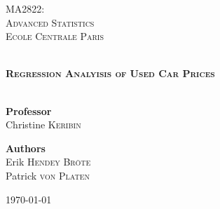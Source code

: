 \begin{titlepage}
\begin{center}


\hfill

\vfill 

\textsc{\Large MA2822:}\\ \textsc{\Large Advanced Statistics}\\[0.5cm]
\textsc{\Large Ecole Centrale Paris}\\[0.5cm]

\vfill

\HRule \\[0.4cm]
{ \LARGE \bfseries \textsc{Regression Analyisis of Used Car Prices}\\[0.4cm] }
\HRule \\[1.5cm]


\vfill

{\large
\begin{center}
  \textbf{Professor}\\[0.1cm]
  Christine \textsc{Keribin}
\end{center}
\vfill
\begin{center}
  \textbf{Authors}\\[0.1cm]
  Erik \textsc{Hendey Bröte}\\[0.1cm]
  Patrick \textsc{von Platen}
\end{center}
}

\vfill

{\large \today}

\end{center}
\end{titlepage}